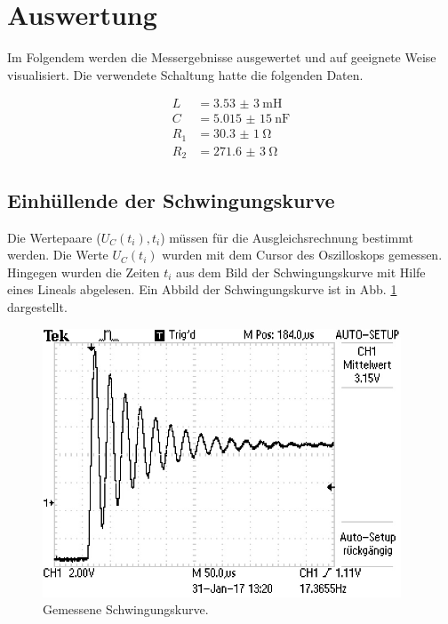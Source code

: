 



\section{Auswertung}

Im Folgendem werden die Messergebnisse ausgewertet und auf geeignete Weise
visualisiert.
Die verwendete Schaltung hatte die folgenden Daten.

\begin{align*}
  L &= \SI{3,53(3)}{\milli\henry} \\
  C &= \SI{5,015(15)}{\nano\farad} \\
  R_1 &= \SI{30,3(1)}{\ohm} \\
  R_2 &= \SI{271,6(3)}{\ohm}
\end{align*}

\subsection{Einhüllende der Schwingungskurve}

Die Wertepaare ($U_C(t_i), t_i$) müssen für die Ausgleichsrechnung bestimmt werden.
Die Werte $U_C(t_i)$ wurden mit dem Cursor des Oszilloskops gemessen.
Hingegen wurden die Zeiten $t_i$ aus dem Bild der Schwingungskurve mit
Hilfe eines Lineals abgelesen. Ein Abbild der Schwingungskurve ist in Abb.
\ref{fig:Schwingungskurve} dargestellt.

\begin{figure}
  \centering
  \includegraphics[width=\textwidth, angle=90, height=8cm]{F0001TEK.JPG}
  \caption{Gemessene Schwingungskurve.}
  \label{fig:Schwingungskurve}
\end{figure}

